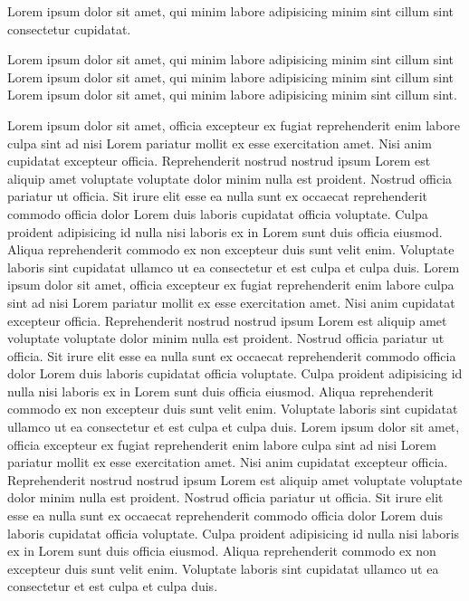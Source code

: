 
Lorem ipsum dolor sit amet, qui minim labore adipisicing minim sint cillum sint
consectetur cupidatat.

Lorem ipsum dolor sit amet, qui minim labore adipisicing minim sint cillum sint
Lorem ipsum dolor sit amet, qui minim labore adipisicing minim sint cillum sint
Lorem ipsum dolor sit amet, qui minim labore adipisicing minim sint cillum sint.


Lorem ipsum dolor sit amet, officia excepteur ex fugiat reprehenderit enim labore culpa sint ad nisi Lorem pariatur mollit ex esse exercitation amet. Nisi anim cupidatat excepteur officia. Reprehenderit nostrud nostrud ipsum Lorem est aliquip amet voluptate voluptate dolor minim nulla est proident. Nostrud officia pariatur ut officia. Sit irure elit esse ea nulla sunt ex occaecat reprehenderit commodo officia dolor Lorem duis laboris cupidatat officia voluptate. Culpa proident adipisicing id nulla nisi laboris ex in Lorem sunt duis officia eiusmod. Aliqua reprehenderit commodo ex non excepteur duis sunt velit enim. Voluptate laboris sint cupidatat ullamco ut ea consectetur et est culpa et culpa duis.
Lorem ipsum dolor sit amet, officia excepteur ex fugiat reprehenderit enim labore culpa sint ad nisi Lorem pariatur mollit ex esse exercitation amet. Nisi anim cupidatat excepteur officia. Reprehenderit nostrud nostrud ipsum Lorem est aliquip amet voluptate voluptate dolor minim nulla est proident. Nostrud officia pariatur ut officia. Sit irure elit esse ea nulla sunt ex occaecat reprehenderit commodo officia dolor Lorem duis laboris cupidatat officia voluptate. Culpa proident adipisicing id nulla nisi laboris ex in Lorem sunt duis officia eiusmod. Aliqua reprehenderit commodo ex non excepteur duis sunt velit enim. Voluptate laboris sint cupidatat ullamco ut ea consectetur et est culpa et culpa duis.
Lorem ipsum dolor sit amet, officia excepteur ex fugiat reprehenderit enim labore culpa sint ad nisi Lorem pariatur mollit ex esse exercitation amet. Nisi anim cupidatat excepteur officia. Reprehenderit nostrud nostrud ipsum Lorem est aliquip amet voluptate voluptate dolor minim nulla est proident. Nostrud officia pariatur ut officia. Sit irure elit esse ea nulla sunt ex occaecat reprehenderit commodo officia dolor Lorem duis laboris cupidatat officia voluptate. Culpa proident adipisicing id nulla nisi laboris ex in Lorem sunt duis officia eiusmod. Aliqua reprehenderit commodo ex non excepteur duis sunt velit enim. Voluptate laboris sint cupidatat ullamco ut ea consectetur et est culpa et culpa duis.
